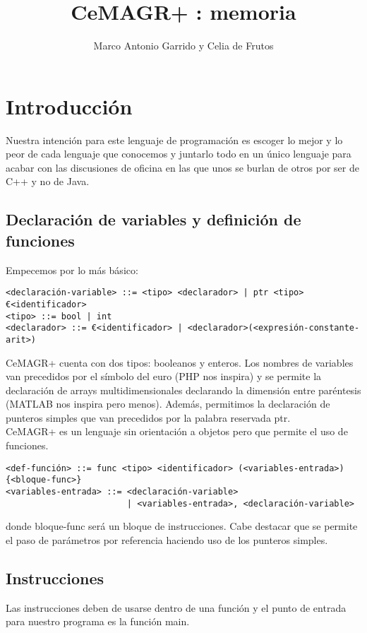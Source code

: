 \documentclass[spanish, a4paper, 12pt] {article}
\newcommand{\lname}[0]{CeMAGR+ }
\begin{document}
\title{\lname: memoria}
\author{Marco Antonio Garrido y Celia de Frutos}
\date{}
\maketitle
\section*{Introducción}
Nuestra intención para este lenguaje de programación es escoger lo mejor y lo peor de cada lenguaje que conocemos y juntarlo todo en un único lenguaje para acabar con las discusiones de oficina en las que unos se burlan de otros por ser de C++ y no de Java.
\subsection*{Declaración de variables y definición de funciones}
Empecemos por lo más básico:
\begin{verbatim}
<declaración-variable> ::= <tipo> <declarador> | ptr <tipo> €<identificador>
<tipo> ::= bool | int
<declarador> ::= €<identificador> | <declarador>(<expresión-constante-arit>)
\end{verbatim}
\lname cuenta con dos tipos: booleanos y enteros. Los nombres de variables van precedidos por el símbolo del euro (PHP nos inspira) y se permite la declaración de arrays multidimensionales declarando la dimensión entre paréntesis (MATLAB nos inspira pero menos). Además, permitimos la declaración de punteros simples que van precedidos por la palabra reservada ptr.\\

\lname es un lenguaje sin orientación a objetos pero que permite el uso de funciones.
\begin{verbatim}
<def-función> ::= func <tipo> <identificador> (<variables-entrada>) {<bloque-func>}
<variables-entrada> ::= <declaración-variable>
                        | <variables-entrada>, <declaración-variable>
\end{verbatim}
donde bloque-func será un bloque de instrucciones. Cabe destacar que se permite el paso de parámetros por referencia haciendo uso de los punteros simples.
\subsection*{Instrucciones}
Las instrucciones deben de usarse dentro de una función y el punto de entrada para nuestro programa es la función main.\\
\end{document}
